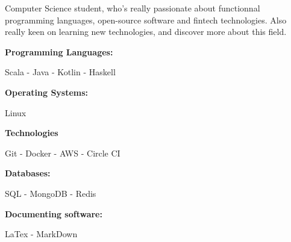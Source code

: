 \documentclass[10pt]{developercv} %
\begin{document}
\begin{minipage}[t]{0.4\textwidth} %
	
    \vspace{-\baselineskip} %
	
    {Computer Science student, who's really passionate about functionnal programming languages, 
    open-source software and fintech technologies.
    \newline Also really keen on learning new technologies, and discover more about this field. 
	}%
\end{minipage}
\hfill %
\begin{minipage}[t]{0.575\textwidth} %
   
	\vspace{-\baselineskip} %
	    \begin{minipage}[t]{0.475 \textwidth}
	 		\textbf{Programming Languages:}
            
    		{Scala - Java - Kotlin - Haskell}

    		\textbf{Operating Systems:}

    		{Linux}

            \textbf{Technologies}

            {Git - Docker - AWS - Circle CI}
	    \end{minipage}
        \hfill
	    \begin{minipage}[t]{0.5 \textwidth}
	 		\textbf{Databases:}

            {SQL - MongoDB - Redis}

       		\textbf{Documenting software:}

    		{LaTex - MarkDown}
        \end{minipage}
\end{minipage}


\end{document}
